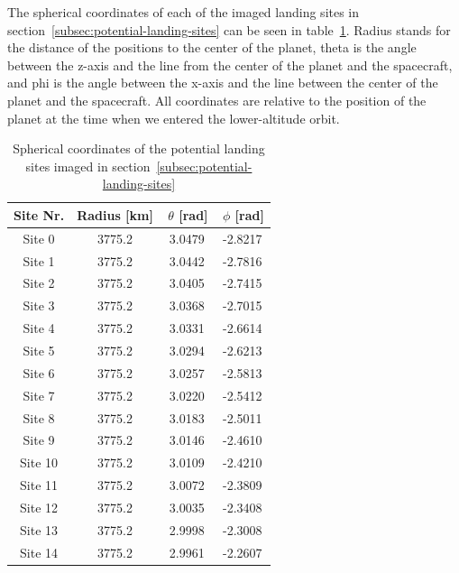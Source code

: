 \documentclass[reprint,english,notitlepage]{revtex4-2}
\begin{document}
    The spherical coordinates of each of the imaged landing sites in section~\ref{subsec:potential-landing-sites} can be seen in table~\ref{tab:land_coords}.
    Radius stands for the distance of the positions to the center of the planet, theta is the angle between the z-axis and the line from the center of the planet and the spacecraft, and phi is the angle between the x-axis and the line between the center of the planet and the spacecraft.
    All coordinates are relative to the position of the planet at the time when we entered the lower-altitude orbit.\\
    \begin{table}[h]
        \begin{tabular}{|c|c|c|c|}
            \hline
            Site Nr. & Radius [km] & $\,\theta$ [rad] & $\,\phi$ [rad]\\
            \hline
            Site 0 & 3775.2 & 3.0479 & -2.8217\\
            \hline
            Site 1 & 3775.2 & 3.0442 & -2.7816\\
            \hline
            Site 2 & 3775.2 & 3.0405 & -2.7415\\
            \hline
            Site 3 & 3775.2 & 3.0368 & -2.7015\\
            \hline
            Site 4 & 3775.2 & 3.0331 & -2.6614\\
            \hline
            Site 5 & 3775.2 & 3.0294 & -2.6213\\
            \hline
            Site 6 & 3775.2 & 3.0257 & -2.5813\\
            \hline
            Site 7 & 3775.2 & 3.0220 & -2.5412\\
            \hline
            Site 8 & 3775.2 & 3.0183 & -2.5011\\
            \hline
            Site 9 & 3775.2 & 3.0146 & -2.4610\\
            \hline
            Site 10 & 3775.2 & 3.0109 & -2.4210\\
            \hline
            Site 11 & 3775.2 & 3.0072 & -2.3809\\
            \hline
            Site 12 & 3775.2 & 3.0035 & -2.3408\\
            \hline
            Site 13 & 3775.2 & 2.9998 & -2.3008\\
            \hline
            Site 14 & 3775.2 & 2.9961 & -2.2607\\
            \hline
        \end{tabular}
        \caption{Spherical coordinates of the potential landing sites imaged in section~\ref{subsec:potential-landing-sites}}
        \label{tab:land_coords}
    \end{table}
\end{document}
